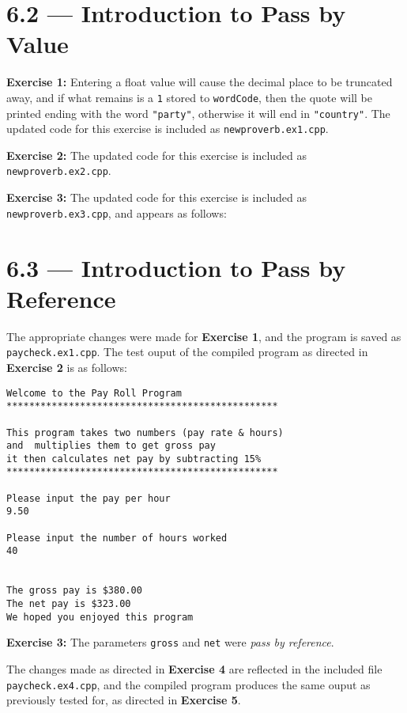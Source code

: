 \documentclass[11pt]{article}
\begin{document}
\newpage
\section*{6.2 --- Introduction to Pass by Value}

	\textbf{Exercise 1:} Entering a float value will cause the decimal place to be truncated away, and if what remains is a \texttt{1} stored to \texttt{wordCode}, then the quote will be printed ending with the word \texttt{"party"}, otherwise it will end in \texttt{"country"}. The updated code for this exercise is included as \texttt{newproverb.ex1.cpp}.

	\textbf{Exercise 2:} The updated code for this exercise is included as \texttt{newproverb.ex2.cpp}.

	\textbf{Exercise 3:} The updated code for this exercise is included as \texttt{newproverb.ex3.cpp}, and appears as follows: 


\newpage
\section*{6.3 --- Introduction to Pass by Reference}

	The appropriate changes were made for \textbf{Exercise 1}, and the program is saved as \texttt{paycheck.ex1.cpp}. The test ouput of the compiled program as directed in \textbf{Exercise 2} is as follows: \begin{verbatim}
Welcome to the Pay Roll Program
************************************************

This program takes two numbers (pay rate & hours)
and  multiplies them to get gross pay
it then calculates net pay by subtracting 15%
************************************************

Please input the pay per hour
9.50

Please input the number of hours worked
40


The gross pay is $380.00
The net pay is $323.00
We hoped you enjoyed this program
\end{verbatim}

	\textbf{Exercise 3:} The parameters \lstinline{gross} and \lstinline{net} were \emph{pass by reference}.

	The changes made as directed in \textbf{Exercise 4} are reflected in the included file \texttt{paycheck.ex4.cpp}, and the compiled program produces the same ouput as previously tested for, as directed in \textbf{Exercise 5}.
\end{document}

